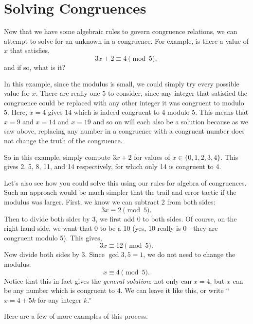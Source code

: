 \documentclass[12pt]{article}
\begin{document}
\section{Solving Congruences}

Now that we have some algebraic rules to govern congruence relations, we can attempt to solve for an unknown in a congruence.  For example, is there a value of $x$ that satisfies,
\[3x + 2 \equiv 4 \pmod{5},\]
and if so, what is it?

In this example, since the modulus is small, we could simply try every possible value for $x$.  There are really one 5 to consider, since any integer that satisfied the congruence could be replaced with any other integer it was congruent to modulo 5.  Here, $x = 4$ gives $14$ which is indeed congruent to 4 modulo 5.  This means that $x = 9$  and $x = 14$ and $x = 19$ and so on will each also be a solution because as we saw above, replacing any number in a congruence with a congruent number does not change the truth of the congruence.

So in this example, simply compute $3x + 2$ for values of $x \in \{0,1,2,3,4\}$.  This gives 2, 5, 8, 11, and 14 respectively, for which only 14 is congruent to 4.  

Let's also see how you could solve this using our rules for algebra of congruences.  Such an approach would be much simpler that the trail and error tactic if the modulus was larger.  First, we know we can subtract 2 from both sides:
\[3x \equiv 2 \pmod{5}.\]
Then to divide both sides by 3, we first add 0 to both sides.  Of course, on the right hand side, we want that 0 to be a 10 (yes, $10$ really is 0 - they are congruent modulo 5).  This gives,
\[3x \equiv 12 \pmod{5}.\]
Now divide both sides by 3.  Since $\gcd{3,5} = 1$, we do not need to change the modulus:
\[x \equiv 4 \pmod{5}.\]
Notice that this in fact gives the {\em general solution}: not only can $x = 4$, but $x$ can be any number which is congruent to 4.   We can leave it like this, or write ``$x = 4 + 5k$ for any integer $k$.''

Here are a few of more examples of this process.
\end{document}
